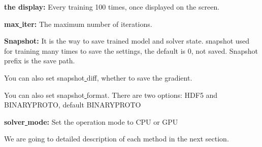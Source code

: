 \documentclass[12pt]{article}
\begin{document}
\noindent\textbf{the display:} Every training 100 times, once displayed on the screen.

\noindent\textbf{max\underline{{ }{ }}iter:} The maximum number of iterations.

\noindent\textbf{Snapshot:} It is the way to save trained model and solver state. snapshot used for training many times to save the settings, the default is 0, not saved. Snapshot\underline{{ }{ }}prefix is the save path.

\noindent You can also set snapshot\underline{{ }{ }}diff, whether to save the gradient.

\noindent You can also set snapshot\underline{{ }{ }}format. There are two options: HDF5 and BINARYPROTO, default BINARYPROTO

\noindent\textbf{solver\underline{{ }{ }}mode: } Set the operation mode to CPU or GPU

We are going to detailed description of each method in the next section.





\newpage
{}


\end{document}
